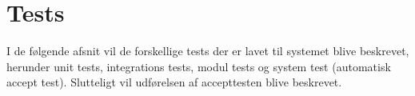 \chapter{Tests}

I de følgende afsnit vil de forskellige tests der er lavet til systemet blive beskrevet, herunder unit tests, integrations tests, modul tests og system test (automatisk accept test). Slutteligt vil udførelsen af accepttesten blive beskrevet.